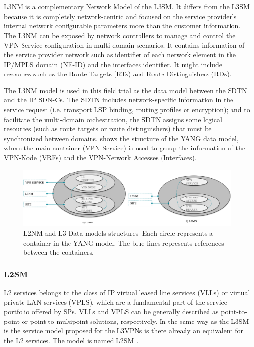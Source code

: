 \documentclass[a4paper,fleqn]{cas-dc}
\begin{document}
L3NM \cite{voyer2019internet} is a complementary Network Model of the L3SM. It differs from the L3SM because it is completely network-centric and focused on the service provider's internal network configurable parameters more than the customer information. The L3NM can be exposed by network controllers to manage and control the VPN Service configuration in multi-domain scenarios. It contains information of the service provider network such as identifier of each network element in the IP/MPLS domain (NE-ID) and the interfaces identifier. It might include resources such as the Route Targets (RTs) and Route Distinguishers (RDs).

The L3NM model is used in this field trial as the data model  between the SDTN and the IP SDN-Cs. The SDTN includes network-specific information in the service request (i.e. transport LSP binding, routing profiles or encryption); and to facilitate the multi-domain orchestration, the SDTN assigns some logical resources (such as route targets or route distinguishers) that must be synchronized between domains.  shows the structure of the YANG data model, where the main container (VPN Service) is used to group the information of the VPN-Node (VRFs) and the VPN-Network Accesses (Interfaces).

\begin{figure}
	\centering
		\includegraphics[scale=0.5]{figs/L3NM_L2NM.png}
	\caption{L2NM and L3 Data models structures. Each circle represents a container in the YANG model. The blue lines represents references between the containers.}
	\label{FIG:l3nm} 
\end{figure}

\subsubsection{L2SM}
\label{section:l2nm}

L2 services belongs to the class of IP virtual leased line services (VLLs) or virtual private LAN services (VPLS)\cite{andersson2006framework}, which are a fundamental part of the service portfolio offered by SPs. 
VLLs and VPLS can be generally described as point-to-point or point-to-multipoint solutions, respectively. In the same way as the L3SM is the service model proposed for the L3VPNs is there already an equivalent for the L2 services. The model is named L2SM \cite{wen2018yang}. 
\end{document}
